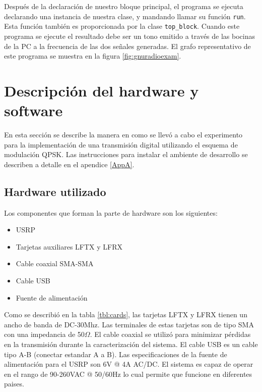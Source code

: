 Despu\'es de la declaraci\'on de nuestro bloque principal, el programa se
ejecuta declarando una instancia de nuestra clase, y mandando llamar su
funci\'on \verb|run|. Esta funci\'on tambi\'en es proporcionada por la clase
\verb|top_block|. Cuando este programa se ejecute el resultado debe ser un tono
emitido a trav\'es de las bocinas de la PC a la frecuencia de las dos se\~nales
generadas. El grafo representativo de este programa se muestra en la figura
\ref{fig:gnuradioexam}.

\section{Descripci\'on del hardware y software}
En esta secci\'on se describe la manera en como se llev\'o a cabo el experimento para la
implementaci\'on de una transmisi\'on digital utilizando el esquema de modulaci\'on QPSK. Las
instrucciones para instalar el ambiente de desarrollo se describen a detalle en el apendice
\ref{AppA}.

\subsection{Hardware utilizado}
Los componentes que forman la parte de hardware son los siguientes:

\begin{itemize}
  \item USRP
  \item Tarjetas auxiliares LFTX y LFRX
  \item Cable coaxial SMA-SMA
  \item Cable USB
  \item Fuente de alimentaci\'on
\end{itemize} 

Como se describi\'o en la tabla \ref{tbl:cards}, las tarjetas LFTX y LFRX tienen un ancho de banda
de DC-30Mhz. Las terminales de estas tarjetas son de tipo SMA con una impedancia de 50$\Omega$. El
cable coaxial se utiliz\'o para minimizar p\'erdidas en la transmisi\'on durante la caracterizaci\'on
del sistema. El cable USB es un cable tipo A-B (conectar estandar A a B). Las especificaciones de la
fuente de alimentaci\'on para el USRP son 6V @ 4A AC/DC. El sistema es capaz de operar en el rango
de 90-260VAC @ 50/60Hz lo cual permite que funcione en diferentes paises.


